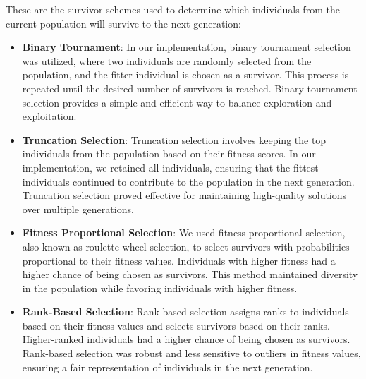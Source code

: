 These are the survivor schemes used to determine which individuals from the current population will survive to the next generation:

\begin{itemize}
    \item \textbf{Binary Tournament}: In our implementation, binary tournament selection was utilized, where two individuals are randomly selected from the population, and the fitter individual is chosen as a survivor. This process is repeated until the desired number of survivors is reached. Binary tournament selection provides a simple and efficient way to balance exploration and exploitation.
    
    \item \textbf{Truncation Selection}: Truncation selection involves keeping the top individuals from the population based on their fitness scores. In our implementation, we retained all individuals, ensuring that the fittest individuals continued to contribute to the population in the next generation. Truncation selection proved effective for maintaining high-quality solutions over multiple generations.
    
    \item \textbf{Fitness Proportional Selection}: We used fitness proportional selection, also known as roulette wheel selection, to select survivors with probabilities proportional to their fitness values. Individuals with higher fitness had a higher chance of being chosen as survivors. This method maintained diversity in the population while favoring individuals with higher fitness.
    
    \item \textbf{Rank-Based Selection}: Rank-based selection assigns ranks to individuals based on their fitness values and selects survivors based on their ranks. Higher-ranked individuals had a higher chance of being chosen as survivors. Rank-based selection was robust and less sensitive to outliers in fitness values, ensuring a fair representation of individuals in the next generation.
\end{itemize}



